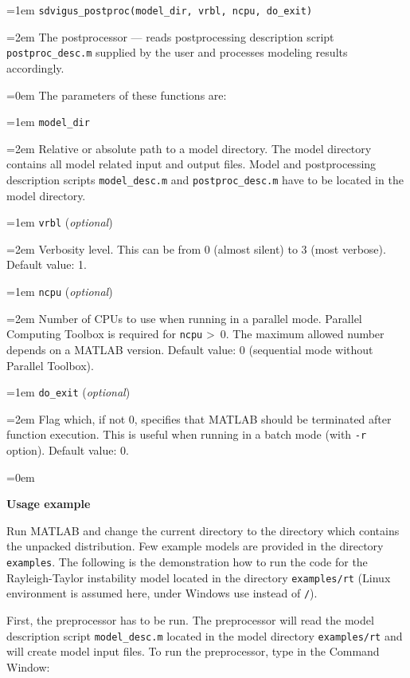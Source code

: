 \documentclass[a4paper,onesided,12pt]{letter}
\begin{document}
\begin{list}{}{\leftmargin=1em}
\leftskip=1em \texttt{sdvigus\_postproc(model\_dir, vrbl, ncpu, do\_exit)}

\leftskip=2em The postprocessor --- reads postprocessing description script \texttt{postproc\_desc.m} supplied by the user and processes modeling results accordingly.

\leftskip=0em The parameters of these functions are:

\leftskip=1em \texttt{model\_dir}

\leftskip=2em Relative or absolute path to a model directory. The model directory contains all model related input and output files. Model and postprocessing description scripts \texttt{model\_desc.m} and \texttt{postproc\_desc.m} have to be located in the model directory.

\leftskip=1em \texttt{vrbl} (\textsl{optional})

\leftskip=2em Verbosity level. This can be from 0 (almost silent) to 3 (most verbose). Default value: 1.

\leftskip=1em \texttt{ncpu} (\textsl{optional})

\leftskip=2em Number of CPUs to use when running in a parallel mode. Parallel Computing Toolbox is required for \texttt{ncpu} \textgreater\ 0. The maximum allowed number depends on a MATLAB version. Default value: 0 (sequential mode without Parallel Toolbox).

\leftskip=1em \texttt{do\_exit} (\textsl{optional})

\leftskip=2em Flag which, if not 0, specifies that MATLAB should be terminated after function execution. This is useful when running in a batch mode (with \texttt{-r} option). Default value: 0.

\leftskip=0em

\item \textbf{Usage example}

Run MATLAB and change the current directory to the directory which contains the unpacked distribution. Few example models are provided in the directory \texttt{examples}. The following is the demonstration how to run the code for the Rayleigh-Taylor instability model located in the directory \texttt{examples/rt} (Linux environment is assumed here, under Windows use \texttt{} instead of \texttt{/}).

First, the preprocessor has to be run. The preprocessor will read the model description script \texttt{model\_desc.m} located in the model directory \texttt{examples/rt} and will create model input files. To run the preprocessor, type in the Command Window:


\end{list}
\end{document}
